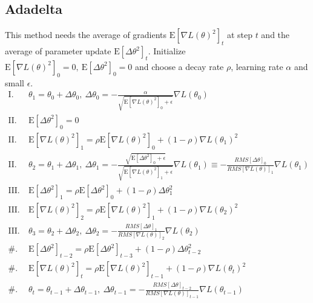 \documentclass{article}
\begin{document}
        \subsection{Adadelta}
            This method needs the average of gradients $\mathrm{E}[\nabla L(\theta)^2]_t$ at step $t$ and the average of parameter update $\mathrm{E}[\Delta \theta^2]_t$. Initialize $\mathrm{E}[\nabla L(\theta)^2]_0 = 0,~\mathrm{E}[\Delta \theta^2]_0 = 0$ and choose a decay rate $\rho$, learning rate $\alpha$ and small $\epsilon$.
            \begin{align*}
                \mathrm{I}.~& \theta_1 = \theta_0 + \Delta \theta_0,~ \Delta \theta_0 = - \frac{\alpha}{ \sqrt{ \mathrm{E}[\nabla L(\theta)^2]_0 + \epsilon} }\nabla L(\theta_0) \\[0.3cm]
                \mathrm{II}.~& \mathrm{E}[\Delta \theta^2]_0 = 0\\
                \mathrm{II}.~& \mathrm{E}[\nabla L(\theta)^2]_1 = \rho \mathrm{E}[\nabla L(\theta)^2]_0 + (1 - \rho) \nabla L(\theta_1)^2\\
                \mathrm{II}.~& \theta_2 = \theta_1 + \Delta \theta_1,~ \Delta \theta_1 = - \frac{ \sqrt{ \mathrm{E}[\Delta \theta^2]_0 + \epsilon} }{ \sqrt{\mathrm{E}[\nabla L(\theta)^2]_1 + \epsilon} }\nabla L(\theta_1) \equiv - \frac{RMS[\Delta \theta]_0}{RMS[\nabla L(\theta)]_1}\nabla L(\theta_1) \\[0.3cm]
                \mathrm{III}.~& \mathrm{E}[\Delta \theta^2]_1 = \rho \mathrm{E}[\Delta \theta^2]_0 + (1-\rho) \Delta\theta_1^2 \\
                \mathrm{III}.~& \mathrm{E}[\nabla L(\theta)^2]_2 = \rho \mathrm{E}[\nabla L(\theta)^2]_1 + (1 - \rho) \nabla L(\theta_2)^2 \\
                \mathrm{III}.~& \theta_3 = \theta_2 + \Delta \theta_2,~ \Delta \theta_2 = - \frac{RMS[\Delta \theta]_1}{RMS[\nabla L(\theta)]_2}\nabla L(\theta_2)\\[0.3cm]
                \mathrm{\#}.~& \mathrm{E}[\Delta \theta^2]_{t-2} = \rho \mathrm{E}[\Delta \theta^2]_{t-3} + (1-\rho) \Delta\theta_{t-2}^2\\
                \mathrm{\#}.~& \mathrm{E}[\nabla L(\theta)^2]_t = \rho \mathrm{E}[\nabla L(\theta)^2]_{t-1} + (1 - \rho) \nabla L(\theta_t)^2\\
                \mathrm{\#}.~& \theta_t = \theta_{t-1} + \Delta \theta_{t-1},~\Delta \theta_{t-1} = - \frac{RMS[\Delta \theta]_{t-2}}{RMS[\nabla L(\theta)]_{t-1}}\nabla L(\theta_{t-1})
            \end{align*}
\end{document}
